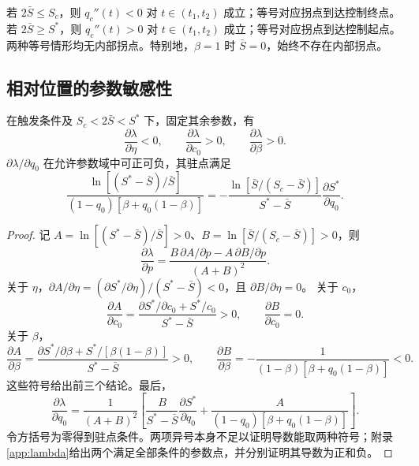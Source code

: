 \documentclass[lang=cn,a4paper,newtx]{elegantpaper}
\numberwithin{equation}{section}
\theoremstyle{plain}
\begin{document}
若 $2\bar S\le S_c$，则 $q_c''(t)<0$ 对 $t\in(t_1,t_2)$ 成立；等号对应拐点到达控制终点。若 $2\bar S\ge S^*$，则 $q_c''(t)>0$ 对 $t\in(t_1,t_2)$ 成立；等号对应拐点到达控制起点。两种等号情形均无内部拐点。特别地，$\beta=1$ 时 $\bar S=0$，始终不存在内部拐点。

\subsection{相对位置的参数敏感性}
\label{sec:s1:inflection-position}
\begin{proposition}
\label{prop:s1:lambda-sensitivity}
在触发条件及 $S_c<2\bar S<S^*$ 下，固定其余参数，有
\[
\frac{\partial\lambda}{\partial\eta}<0,\qquad
\frac{\partial\lambda}{\partial c_0}>0,\qquad
\frac{\partial\lambda}{\partial\beta}>0.
\]
$\partial\lambda/\partial q_0$ 在允许参数域中可正可负，其驻点满足
\begin{equation}
\frac{\ln[(S^*-\bar S)/\bar S]}{(1-q_0)[\beta+q_0(1-\beta)]}
=-\frac{\ln[\bar S/(S_c-\bar S)]}{S^*-\bar S}
\frac{\partial S^*}{\partial q_0}.
\label{eq:s1:lambda-q0-stationary}
\end{equation}
\end{proposition}
\begin{proof}
记 $A=\ln[(S^*-\bar S)/\bar S]>0$、$B=\ln[\bar S/(S_c-\bar S)]>0$，则
\[
\frac{\partial\lambda}{\partial p}
=\frac{B\,\partial A/\partial p-A\,\partial B/\partial p}{(A+B)^2}.
\]
关于 $\eta$，$\partial A/\partial\eta=(\partial S^*/\partial\eta)/(S^*-\bar S)<0$，且 $\partial B/\partial\eta=0$。
关于 $c_0$，
\[
\frac{\partial A}{\partial c_0}=
\frac{\partial S^*/\partial c_0+S^*/c_0}{S^*-\bar S}>0,
\qquad \frac{\partial B}{\partial c_0}=0.
\]
关于 $\beta$，
\[
\frac{\partial A}{\partial\beta}
=\frac{\partial S^*/\partial\beta+S^*/[\beta(1-\beta)]}{S^*-\bar S}>0,
\qquad
\frac{\partial B}{\partial\beta}
=-\frac1{(1-\beta)[\beta+q_0(1-\beta)]}<0.
\]
这些符号给出前三个结论。最后，
\begin{equation}
\frac{\partial\lambda}{\partial q_0}
=\frac1{(A+B)^2}\left[
\frac{B}{S^*-\bar S}\frac{\partial S^*}{\partial q_0}
+\frac{A}{(1-q_0)[\beta+q_0(1-\beta)]}\right].
\label{eq:lambda-q0-sign}
\end{equation}
令方括号为零得到驻点条件。两项异号本身不足以证明导数能取两种符号；附录\ref{app:lambda}给出两个满足全部条件的参数点，并分别证明其导数为正和负。
\end{proof}
\end{document}

